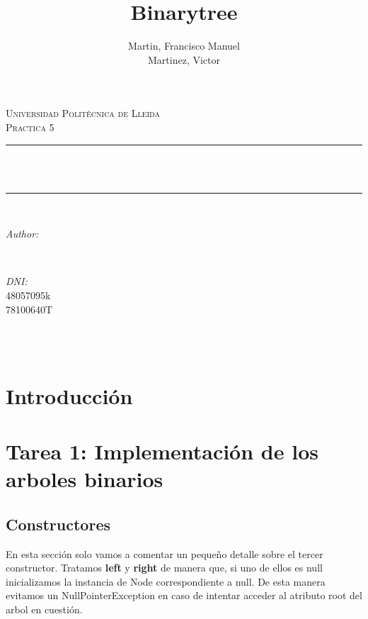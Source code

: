 \documentclass{article}
\title{Binarytree}
\author{Martin, Francisco Manuel \\
        Martinez, Victor
}
\makeatletter
\let\thetitle\@title
\let\theauthor\@author
\let\thedate\@date
\makeatother
\begin{document}
    \begin{titlepage}
	\centering
    \vspace*{0.5 cm}

    \textsc{\LARGE Universidad Politécnica de Lleida}\\[2.0 cm]	%
	\textsc{\large Practica 5}\\[0.5 cm]				%
	\rule{\linewidth}{0.2 mm} \\[0.4 cm]
	{ \huge \bfseries \thetitle}\\
	\rule{\linewidth}{0.2 mm} \\[1.5 cm]

	\begin{minipage}{0.4\textwidth}
		\begin{flushleft} \large
			\emph{Author:}\\
			\theauthor
			\end{flushleft}
			\end{minipage}~
			\begin{minipage}{0.4\textwidth}
			\begin{flushright} \large
			\emph{DNI:} \\
			48057095k \\
			78100640T%
		\end{flushright}
	\end{minipage}\\[2 cm]

	{\large \thedate}\\[2 cm]

	\vfill

\end{titlepage}
\tableofcontents
\pagebreak

\section{Introducción}

\section{Tarea 1: Implementación de los arboles binarios}
    \subsection{Constructores}
    En esta sección solo vamos a comentar un pequeño detalle sobre el tercer constructor. \newline
    Tratamos \textbf{left} y \textbf{right} de manera que, si uno de ellos es null inicializamos la instancia de Node correspondiente a null. \newline
    De esta manera evitamos un NullPointerException en caso de intentar acceder al atributo root del arbol en cuestión.
\end{document}
